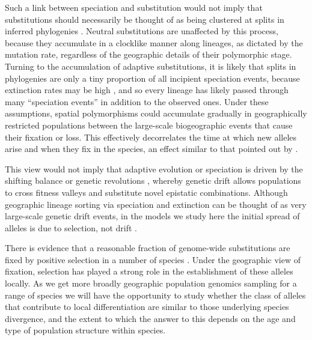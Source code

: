 \documentclass{article}
\begin{document}
Such a link between speciation and substitution would not imply that
substitutions should necessarily be thought of as being clustered at splits in inferred phylogenies 
\citep[see ][for a recent exchange on this]{Pennell:14,Venditti:14,Pennell:14B}. 
Neutral substitutions are unaffected by this process, 
because they accumulate in a clocklike manner along lineages, 
as dictated by the mutation rate, 
regardless of the geographic details of their polymorphic stage. 
Turning to the accumulation of adaptive substitutions, 
it is likely that splits in phylogenies are only a tiny proportion of all incipient speciation events, 
because extinction rates may be high \citep{Rosenblum:12}, 
and so every lineage has likely passed through many ``speciation events'' in addition to the observed ones.
Under these assumptions,
spatial polymorphisms could accumulate gradually in geographically restricted populations
between the large-scale biogeographic events that cause their fixation or loss. 
This effectively decorrelates the time at which new alleles arise and when they fix in the species,
an effect similar to that pointed out by \citet{Gillespie:94}.

 
This view would not imply that adaptive evolution or speciation is driven by the
shifting balance or genetic revolutions 
\citep{Wright:32, Mayr-genetic-revol:1954}, 
whereby genetic drift allows
populations to cross fitness valleys and substitute novel epistatic combinations. 
Although geographic lineage sorting via speciation and extinction 
can be thought of as very large-scale genetic drift events,
in the models we study here the initial spread of alleles is due to selection, not drift
\citep[see also ][for discussion]{Futuyma:89}. 


There is evidence that a reasonable fraction of genome-wide substitutions are fixed by positive selection in a number of species
\citep[most notably Drosophila, ][]{Sella:09}. 
Under the geographic view of fixation, 
selection has played a strong role in the establishment of these alleles locally. 
As we get more broadly geographic population genomics sampling for a range of species 
we will have the opportunity to study whether the class of alleles that contribute to local differentiation 
are similar to those underlying species divergence, 
and the extent to which the answer to this depends on the
age and type of population structure within species. 
\end{document}
